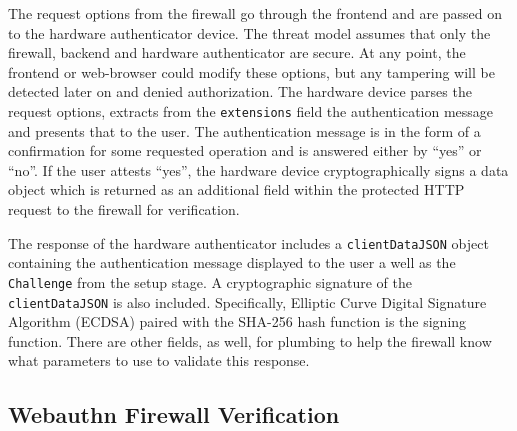 The request options from the firewall go through the frontend and are passed on to the hardware authenticator device. The threat model assumes that only the firewall, backend and hardware authenticator are secure. At any point, the frontend or web-browser could modify these options, but any tampering will be detected later on and denied authorization. The hardware device parses the request options, extracts from the \lstinline{extensions} field the authentication message and presents that to the user. The authentication message is in the form of a confirmation for some requested operation and is answered either by ``yes'' or ``no''. If the user attests ``yes'', the hardware device cryptographically signs a data object which is returned as an additional field within the protected HTTP request to the firewall for verification.

The response of the hardware authenticator includes a \lstinline{clientDataJSON} object containing the authentication message displayed to the user a well as the \lstinline{Challenge} from the setup stage. A cryptographic signature of the \lstinline{clientDataJSON} is also included. Specifically, Elliptic Curve Digital Signature Algorithm (ECDSA) paired with the SHA-256 hash function is the signing function. There are other fields, as well, for plumbing to help the firewall know what parameters to use to validate this response.

\iffalse
\begin{lstlisting}
const credential: PublicKeyCredential = {
    id: string, // base64 encoded
    rawId: []bytes,
    response: {
        attestationObject: []bytes,
        clientDataJSON: {
            challenge: string, // base64 encoded
            clientExtensions: []bytes,
            hashAlgorithm: string,
            origin: string,
        },
    },
    type: 'public-key',
};
\end{lstlisting}

The \lstinline{clientDataJSON} contains the \lstinline{clientExtensions} which is the data displayed to the user as well as the \lstinline{challenge} from the setup stage. The cryptographic signature of the \lstinline{clientDataJSON} is included in the \lstinline{attestationObject} and uses the Elliptic Curve Digital Signature Algorithm (ECDSA) paired with the SHA-256 hash function. The other fields are for plumbing and help the firewall know what parameters to use to validate this authentication data object.
\fi

\subsection{Webauthn Firewall Verification}

